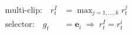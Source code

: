 \documentclass[border=8pt,12pt]{standalone}
\begin{document}
\color{ink}
$\displaystyle \begin{aligned}\text{multi-clip:}\quad r_t^I&=\max_{j=1,\ldots,k}r_t^j\\ \text{selector:}\quad g_t&=\mathbf e_i\;\Longrightarrow\; r_t^I=r_t^i\end{aligned}$
\end{document}
